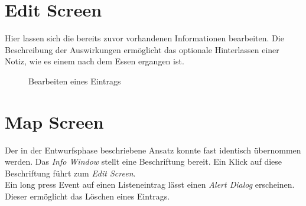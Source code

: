 \documentclass[
    DIV12,
    cleardouble=plain,
    headings=normal,
    pdftex,
    headexclude,footexclude,
    final
]{scrreprt}
\begin{document}
\section{Edit Screen}
Hier lassen sich die bereits zuvor vorhandenen Informationen bearbeiten. Die Beschreibung der Auswirkungen ermöglicht das optionale Hinterlassen einer Notiz, wie es einem nach dem Essen ergangen ist.
\begin{figure}[H]
	\centering
	\caption{Bearbeiten eines Eintrags}
	\label{editScreen}
\end{figure}


\newpage

\section{Map Screen}
Der in der Entwurfsphase beschriebene Ansatz konnte fast identisch übernommen werden. Das \textit{Info Window} stellt eine Beschriftung bereit. Ein Klick auf diese Beschriftung führt zum \textit{Edit Screen}.\\
Ein long press Event auf einen Listeneintrag lässt einen \textit{Alert Dialog} erscheinen. Dieser ermöglicht das Löschen eines Eintrags.
\end{document}
